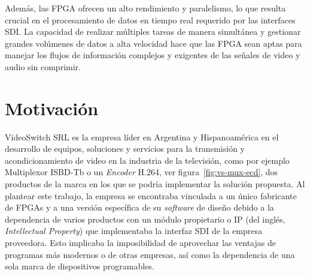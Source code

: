 Además, las FPGA ofrecen un alto rendimiento y paralelismo, lo que resulta
crucial en el procesamiento de datos en tiempo real requerido por las interfaces
SDI\@. La capacidad de realizar múltiples tareas de manera simultánea y gestionar
grandes volúmenes de datos a alta velocidad hace que las FPGA sean aptas para
manejar los flujos de información complejos y exigentes de las señales de video
y audio sin comprimir.

\section{Motivación}

VideoSwitch SRL \citep{vs-srl} es la empresa líder en Argentina y Hispanoamérica
en el desarrollo de equipos, soluciones y servicios para la transmisión y
acondicionamiento de video en la industria de la televisión, como por ejemplo
Multiplexor ISBD-Tb o un \textit{Encoder} H.264, ver figura~\ref{fig:vs-mux-ecd},
dos productos de la marca en los que se podría implementar la solución propuesta.
Al plantear este trabajo, la empresa se encontraba vinculada a un único
fabricante de FPGAs y a una versión específica de su \textit{software} de
diseño debido a la dependencia de varios productos con un módulo propietario o
IP (del inglés, \textit{Intellectual Property}) que implementaba la interfaz SDI
de la empresa proveedora. Esto implicaba la imposibilidad de aprovechar las
ventajas de programas más modernos o de otras empresas, así como la dependencia
de una sola marca de dispositivos programables.


